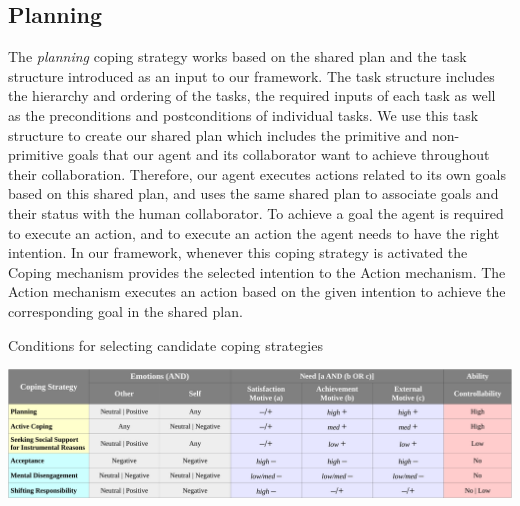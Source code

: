 \documentclass[12pt]{report}
\begin{document}
\subsection{Planning}
The \textit{planning} coping strategy works based on the shared plan and the
task structure introduced as an input to our framework. The task structure
includes the hierarchy and ordering of the tasks, the required inputs of
each task as well as the preconditions and postconditions of individual tasks.
We use this task structure to create our shared plan which includes the
primitive and non-primitive goals that our agent and its collaborator want to
achieve throughout their collaboration. Therefore, our agent executes actions
related to its own goals based on this shared plan, and uses the same shared
plan to associate goals and their status with the human collaborator. To achieve
a goal the agent is required to execute an action, and to execute an action the
agent needs to have the right intention. In our framework, whenever this coping
strategy is activated the Coping mechanism provides the selected intention to
the Action mechanism. The Action mechanism executes an action based on the given
intention to achieve the corresponding goal in the shared plan.

\begin{table}
  \centering
  \caption{Conditions for selecting candidate coping strategies}
  \label{fig:coping_strategies}
  \includegraphics[width=1\textwidth]{figure/coping_algorithms_short_croped.pdf}
\end{table}
\end{document}
